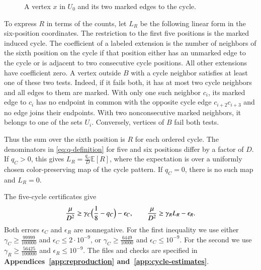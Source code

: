 \documentclass[preprint,11pt,numbers]{elsarticle-arxiv}
\numberwithin{equation}{section}
\theoremstyle{definition}
\begin{document}
\begin{figure}[htbp]
\centering
{}
\caption{A vertex $x$ in $U_0$ and its two marked edges to the cycle.}
\label{fig:odd-cycle-parts}
\end{figure}

To express $R$ in terms of the counts, let $L_R$ be the following
linear form in the six-position coordinates. The restriction to the
first five positions is the marked induced cycle. The coefficient
of a labeled extension is the number of neighbors of the sixth
position on the cycle if that position either has an unmarked edge
to the cycle or is adjacent to two consecutive cycle positions.
All other extensions have coefficient zero. A vertex outside $B$
with a cycle neighbor satisfies at least one of these two tests.
Indeed, if it fails both, it has at most two cycle neighbors and
all edges to them are marked. With only one such neighbor $c_i$,
its marked edge to $c_i$ has no endpoint in common with the
opposite cycle edge $c_{i+2}c_{i+3}$ and no edge joins their endpoints.
With two nonconsecutive marked neighbors, it belongs to one of
the sets $U_i$. Conversely, vertices of $B$ fail both tests.

Thus the sum over the sixth position is $R$ for each ordered
cycle. The denominators in \eqref{eq:q-definition} for five and
six positions differ by a factor of $D$. If $q_C>0$, this gives
$L_R=\frac{q_C}{D}\mathbb E[R]$, where the expectation is over a
uniformly chosen color-preserving map of the cycle pattern. If $q_C=0$,
there is no such map and $L_R=0$.

The five-cycle certificates give
\begin{equation}\label{eq:odd-moment-bounds}
 \frac{\mu}{D^2}\geq\gamma_C\Bigl(\frac{1}{8}-q_C\Bigr)-\epsilon_C,
 \qquad
 \frac{\mu}{D^2}\geq\gamma_R L_R-\epsilon_R.
\end{equation}
Both errors $\epsilon_C$ and $\epsilon_R$ are nonnegative. For the
first inequality we use either
$\gamma_C\geq\frac{99999}{100000}$ and $\epsilon_C\leq2\cdot10^{-9}$,
or $\gamma_C\geq\frac{6449}{10000}$ and $\epsilon_C\leq10^{-9}$.
For the second we use $\gamma_R\geq\frac{56425}{100000}$ and
$\epsilon_R\leq10^{-9}$. The files and checks are specified in
\textbf{Appendices~\ref{app:reproduction} and~\ref{app:cycle-estimates}}.
\end{document}
